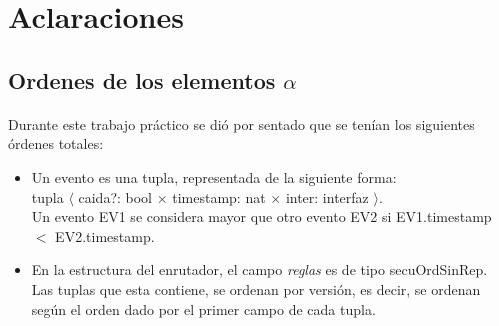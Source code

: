 \section*{Aclaraciones}

\subsection*{Ordenes de los elementos $\alpha$}
\paragraph{}
Durante este trabajo pr\'actico se di\'o por sentado que se ten\'ian los siguientes \'ordenes totales:

\begin{itemize}
 \item Un evento es una tupla, representada de la siguiente forma: \\
tupla $\langle$ caida?: bool  $\times$ timestamp: nat $\times$ inter: interfaz  $\rangle$.\\
Un evento EV1 se considera mayor que otro evento EV2 si EV1.timestamp $<$ EV2.timestamp.
\item En la estructura del enrutador, el campo \textit{reglas} es de tipo secuOrdSinRep. Las tuplas que esta contiene, se ordenan por versi\'on, es decir, se ordenan seg\'un el orden dado por el primer campo de cada tupla.
\end{itemize}





